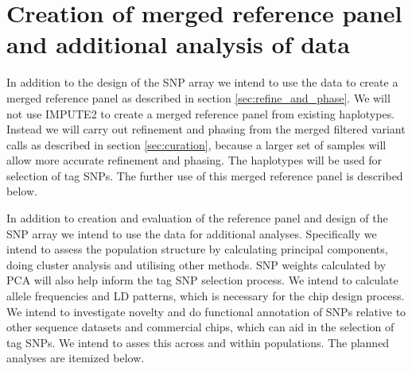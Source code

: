 \section{Creation of merged reference panel and additional analysis of data}

In addition to the design of the SNP array we intend to use the data to create a merged reference panel as described in section \ref{sec:refine_and_phase}. We will not use IMPUTE2 to create a merged reference panel from existing haplotypes. Instead we will carry out refinement and phasing from the merged filtered variant calls as described in section \ref{sec:curation}, because a larger set of samples will allow more accurate refinement and phasing. The haplotypes will be used for selection of tag SNPs. The further use of this merged reference panel is described below.

In addition to creation and evaluation of the reference panel and design of the SNP array we intend to use the data for additional analyses. Specifically we intend to assess the population structure by calculating principal components, doing cluster analysis and utilising other methods. SNP weights calculated by PCA will also help inform the tag SNP selection process. We intend to calculate allele frequencies and LD patterns, which is necessary for the chip design process. We intend to investigate novelty and do functional annotation of SNPs relative to other sequence datasets and commercial chips, which can aid in the selection of tag SNPs. We intend to asses this across and within populations. The planned analyses are itemized below.

